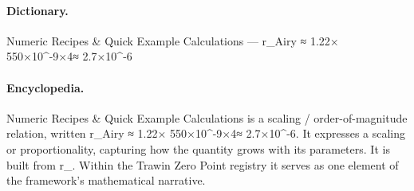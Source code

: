 \paragraph{Dictionary.}
Numeric Recipes \& Quick Example Calculations — r\_Airy ≈ 1.22× 550×10\textasciicircum{}-9×4≈ 2.7×10\textasciicircum{}-6

\paragraph{Encyclopedia.}
Numeric Recipes \& Quick Example Calculations is a scaling / order-of-magnitude relation, written r\_Airy ≈ 1.22× 550×10\textasciicircum{}-9×4≈ 2.7×10\textasciicircum{}-6. It expresses a scaling or proportionality, capturing how the quantity grows with its parameters. It is built from r\_. Within the Trawin Zero Point registry it serves as one element of the framework's mathematical narrative.

